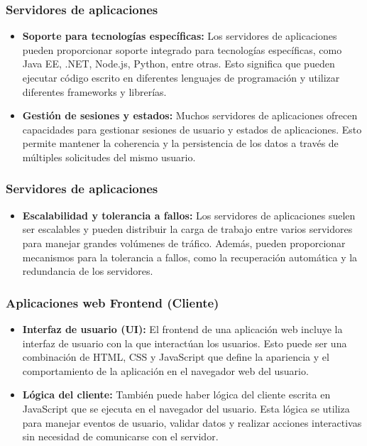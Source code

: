 \begin{frame}
	\frametitle{Servidores de aplicaciones}
	
	\begin{itemize}
		\item \textbf{Soporte para tecnologías específicas:} Los servidores de aplicaciones pueden proporcionar soporte integrado para tecnologías específicas, como Java EE, .NET, Node.js, Python, entre otras. Esto significa que pueden ejecutar código escrito en diferentes lenguajes de programación y utilizar diferentes frameworks y librerías.		
		\item \textbf{Gestión de sesiones y estados:} Muchos servidores de aplicaciones ofrecen capacidades para gestionar sesiones de usuario y estados de aplicaciones. Esto permite mantener la coherencia y la persistencia de los datos a través de múltiples solicitudes del mismo usuario.		
	\end{itemize}	
\end{frame}

\begin{frame}
	\frametitle{Servidores de aplicaciones}
	
	\begin{itemize}
		\item \textbf{Escalabilidad y tolerancia a fallos:} Los servidores de aplicaciones suelen ser escalables y pueden distribuir la carga de trabajo entre varios servidores para manejar grandes volúmenes de tráfico. Además, pueden proporcionar mecanismos para la tolerancia a fallos, como la recuperación automática y la redundancia de los servidores.
		
	\end{itemize}	
\end{frame}

\begin{frame}
	\frametitle{Aplicaciones web Frontend (Cliente)}
	
	\begin{itemize}
		\item \textbf{Interfaz de usuario (UI):} El frontend de una aplicación web incluye la interfaz de usuario con la que interactúan los usuarios. Esto puede ser una combinación de HTML, CSS y JavaScript que define la apariencia y el comportamiento de la aplicación en el navegador web del usuario.		
		\item \textbf{Lógica del cliente:} También puede haber lógica del cliente escrita en JavaScript que se ejecuta en el navegador del usuario. Esta lógica se utiliza para manejar eventos de usuario, validar datos y realizar acciones interactivas sin necesidad de comunicarse con el servidor.		
	\end{itemize}
\end{frame}


